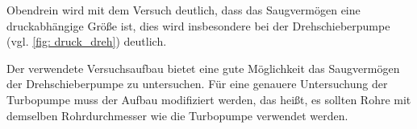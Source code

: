 Obendrein wird mit dem Versuch deutlich, dass das Saugvermögen eine druckabhängige Größe ist, dies wird insbesondere %
bei der Drehschieberpumpe (vgl. \ref{fig: druck_dreh}) deutlich.

Der verwendete Versuchsaufbau bietet eine gute Möglichkeit das Saugvermögen der Drehschieberpumpe zu untersuchen.
Für eine genauere Untersuchung der Turbopumpe muss der Aufbau modifiziert werden, das heißt, es sollten Rohre mit
demselben Rohrdurchmesser wie die Turbopumpe verwendet werden. %

